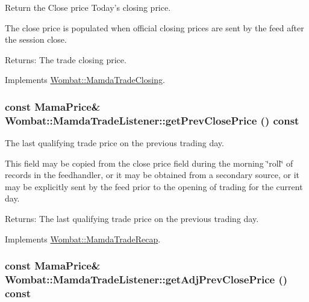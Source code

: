 Return the Close price Today's closing price. 

The close price is populated when official closing prices are sent by the feed after the session close.

\begin{Desc}
\item[Returns:]The trade closing price. \end{Desc}


Implements \hyperlink{classWombat_1_1MamdaTradeClosing_74d8721012d6e43cc9066191355aaec6}{Wombat::Mamda\-Trade\-Closing}.\hypertarget{classWombat_1_1MamdaTradeListener_7cef846e6625cd78c1c05cd25ea8ee09}{
\subsubsection[getPrevClosePrice]{\setlength{\rightskip}{0pt plus 5cm}const Mama\-Price\& Wombat::Mamda\-Trade\-Listener::get\-Prev\-Close\-Price () const}}
\label{classWombat_1_1MamdaTradeListener_7cef846e6625cd78c1c05cd25ea8ee09}


The last qualifying trade price on the previous trading day. 

This field may be copied from the close price field during the morning \char`\"{}roll\char`\"{} of records in the feedhandler, or it may be obtained from a secondary source, or it may be explicitly sent by the feed prior to the opening of trading for the current day.

\begin{Desc}
\item[Returns:]The last qualifying trade price on the previous trading day. \end{Desc}


Implements \hyperlink{classWombat_1_1MamdaTradeRecap_a612fcb5d25ec608317992115fd05349}{Wombat::Mamda\-Trade\-Recap}.\hypertarget{classWombat_1_1MamdaTradeListener_e8de0253e81ad8f4e22380854e0a1750}{
\subsubsection[getAdjPrevClosePrice]{\setlength{\rightskip}{0pt plus 5cm}const Mama\-Price\& Wombat::Mamda\-Trade\-Listener::get\-Adj\-Prev\-Close\-Price () const}}
\label{classWombat_1_1MamdaTradeListener_e8de0253e81ad8f4e22380854e0a1750}


